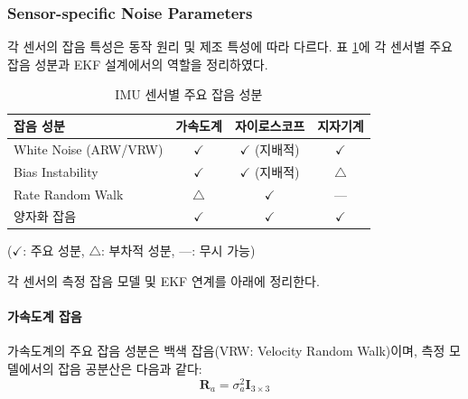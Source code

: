         \subsubsection{Sensor-specific Noise Parameters}

            각 센서의 잡음 특성은 동작 원리 및 제조 특성에 따라 다르다. 표 \ref{tab:sensor_noise}에 각 센서별 주요 잡음 성분과 EKF 설계에서의 역할을 정리하였다.\\

            \begin{table}[H]
                \centering
                \caption{IMU 센서별 주요 잡음 성분}
                \label{tab:sensor_noise}
                \begin{tabular}{lccc}
                    \toprule
                    잡음 성분 & 가속도계 & 자이로스코프 & 지자기계 \\
                    \midrule
                    White Noise (ARW/VRW) & $\checkmark$ & $\checkmark$ (지배적) & $\checkmark$ \\
                    Bias Instability & $\checkmark$ & $\checkmark$ (지배적) & $\triangle$ \\
                    Rate Random Walk & $\triangle$ & $\checkmark$ & --- \\
                    양자화 잡음 & $\checkmark$ & $\checkmark$ & $\checkmark$ \\
                    \bottomrule
                \end{tabular}
            \end{table}

            \noindent ($\checkmark$: 주요 성분, $\triangle$: 부차적 성분, ---: 무시 가능)

            각 센서의 측정 잡음 모델 및 EKF 연계를 아래에 정리한다.\\

            \paragraph{가속도계 잡음}
                가속도계의 주요 잡음 성분은 백색 잡음(VRW: Velocity Random Walk)이며, 측정 모델에서의 잡음 공분산은 다음과 같다:\\

                \begin{equation}
                    \mathbf{R}_a = \sigma_a^2 \mathbf{I}_{3\times 3}
                    \label{eq:accel_noise_cov}
                \end{equation}

